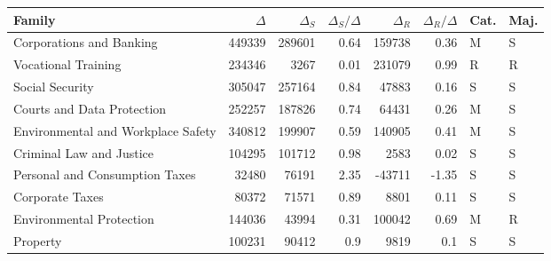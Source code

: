\begin{tabular}{lrrrrrll}
\toprule
 Family                             &   $\Delta$ &   $\Delta_S$ &   $\Delta_S/\Delta$ &   $\Delta_R$ &   $\Delta_R/\Delta$ & Cat.   & Maj.   \\
\midrule
 Corporations and Banking           &     449339 &       289601 &                0.64 &       159738 &                0.36 & M      & S      \\
 Vocational Training                &     234346 &         3267 &                0.01 &       231079 &                0.99 & R      & R      \\
 Social Security                    &     305047 &       257164 &                0.84 &        47883 &                0.16 & S      & S      \\
 Courts and Data Protection         &     252257 &       187826 &                0.74 &        64431 &                0.26 & M      & S      \\
 Environmental and Workplace Safety &     340812 &       199907 &                0.59 &       140905 &                0.41 & M      & S      \\
 Criminal Law and Justice           &     104295 &       101712 &                0.98 &         2583 &                0.02 & S      & S      \\
 Personal and Consumption Taxes     &      32480 &        76191 &                2.35 &       -43711 &               -1.35 & S      & S      \\
 Corporate Taxes                    &      80372 &        71571 &                0.89 &         8801 &                0.11 & S      & S      \\
 Environmental Protection           &     144036 &        43994 &                0.31 &       100042 &                0.69 & M      & R      \\
 Property                           &     100231 &        90412 &                0.9  &         9819 &                0.1  & S      & S      \\
\bottomrule
\end{tabular}